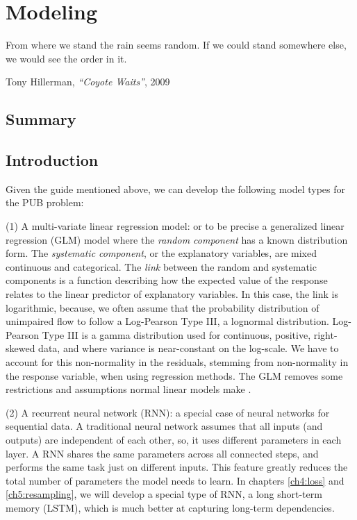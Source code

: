 \chapter{Modeling} \label{ch5:modeling}
\setlength{\epigraphwidth}{4.5in}
\epigraph{From where we stand the rain seems random. If we could stand somewhere else, we would see the order in it.}{Tony Hillerman, \textit{``Coyote Waits''}, 2009}

\section*{Summary}

\section{Introduction}

Given the guide mentioned above, we can develop the following model types for the PUB problem:

(1) A multi-variate linear regression model: or to be precise a generalized linear regression (GLM) model where the \textit{random component} has a known distribution form. The \textit{systematic component}, or the explanatory variables, are mixed continuous and categorical. The \textit{link} between the random and systematic components is a function describing how the expected value of the response relates to the linear predictor of explanatory variables. In this case, the link is logarithmic, because, we often assume that the probability distribution of unimpaired flow to follow a Log-Pearson Type III, a lognormal distribution. Log-Pearson Type III is a gamma distribution used for continuous, positive, right-skewed data, and where variance is near-constant on the log-scale. We have to account for this non-normality in the residuals, stemming from non-normality in the response variable, when using regression methods. The GLM removes some restrictions and assumptions normal linear models make \cite{stat504analysis}.
 
(2) A recurrent neural network (RNN): a special case of neural networks for sequential data. A traditional neural network assumes that all inputs (and outputs) are independent of each other, so, it uses different parameters in each layer. A RNN shares the same parameters across all connected steps, and performs the same task just on different inputs. This feature greatly reduces the total number of parameters the model needs to learn. In chapters \ref{ch4:loss} and \ref{ch5:resampling}, we will develop a special type of RNN, a long short-term memory (LSTM), which is much better at capturing long-term dependencies. 


